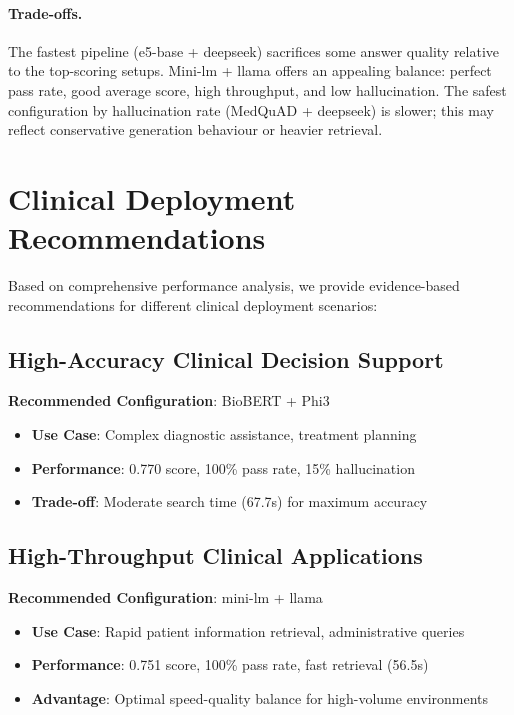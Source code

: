\paragraph{Trade-offs.} The fastest pipeline (e5-base + deepseek) sacrifices some answer quality relative to the top-scoring setups. Mini-lm + llama offers an appealing balance: perfect pass rate, good average score, high throughput, and low hallucination. The safest configuration by hallucination rate (MedQuAD + deepseek) is slower; this may reflect conservative generation behaviour or heavier retrieval.

\section{Clinical Deployment Recommendations}

Based on comprehensive performance analysis, we provide evidence-based recommendations for different clinical deployment scenarios:

\subsection{High-Accuracy Clinical Decision Support}
\textbf{Recommended Configuration}: BioBERT + Phi3
\begin{itemize}
    \item \textbf{Use Case}: Complex diagnostic assistance, treatment planning
    \item \textbf{Performance}: 0.770 score, 100\% pass rate, 15\% hallucination
    \item \textbf{Trade-off}: Moderate search time (67.7s) for maximum accuracy
\end{itemize}

\subsection{High-Throughput Clinical Applications}
\textbf{Recommended Configuration}: mini-lm + llama
\begin{itemize}
    \item \textbf{Use Case}: Rapid patient information retrieval, administrative queries
    \item \textbf{Performance}: 0.751 score, 100\% pass rate, fast retrieval (56.5s)
    \item \textbf{Advantage}: Optimal speed-quality balance for high-volume environments
\end{itemize}

